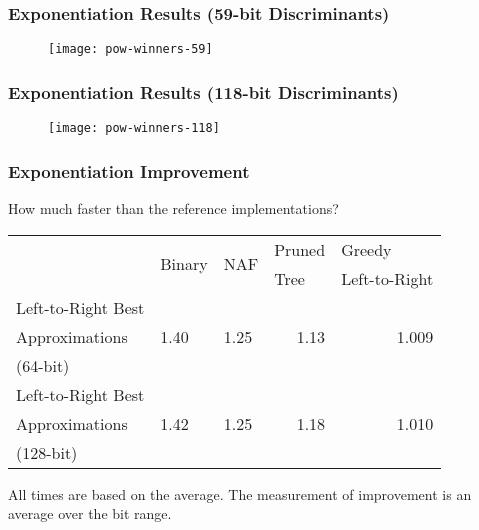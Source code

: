 \documentclass{beamer}
\newcommand{\smallfont}{\fontsize{6pt}{7.2}\selectfont}
\begin{document}
\begin{frame}
\frametitle{Exponentiation Results (59-bit Discriminants)}
\begin{figure}
\texttt{[image: pow-winners-59]}
\end{figure}
\end{frame}
\begin{frame}
\frametitle{Exponentiation Results (118-bit Discriminants)}
\begin{figure}
\texttt{[image: pow-winners-118]}
\end{figure}
\end{frame}

\begin{frame}
\frametitle{Exponentiation Improvement}
How much faster than the reference implementations?
\begin{table}
\centering
\begin{tabular}{ | l | l | l | l | l | }
\hline
& \multirow{2}{*}{Binary} & \multirow{2}{*}{NAF} & Pruned & Greedy \\
& & & Tree & Left-to-Right \\
\hline
Left-to-Right Best & \multirow{3}{*}{1.40} & \multirow{3}{*}{1.25} & \multicolumn{1}{|r|}{\multirow{3}{*}{1.13}} & \multicolumn{1}{|r|}{\multirow{3}{*}{1.009}} \\
Approximations & & & &\\
(64-bit) & & & &\\

\hline

Left-to-Right Best & \multirow{3}{*}{1.42} & \multirow{3}{*}{1.25} & \multicolumn{1}{|r|}{\multirow{3}{*}{1.18}} & \multicolumn{1}{|r|}{\multirow{3}{*}{1.010}} \\
Approximations & & & &\\
(128-bit) & & & &\\

\hline
\end{tabular}
\end{table}

\bigskip
\smallfont
All times are based on the average.  The measurement of improvement is an average over the bit range.
\end{frame}
\end{document}
